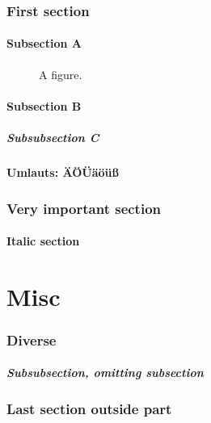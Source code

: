 \documentclass{article}
\begin{document}
  \section{First section}
    \subsection{Subsection A}
    \begin{figure}
      \hypertarget{fig}{}%
      A figure.
      \end{figure}
    \subsection{Subsection B}
    \subsubsection{Subsubsection C}
  \subsection{Umlauts: \"A\"O\"U\"a\"o\"u\ss}
  \newpage
  \section{Very important section}
  \subsection{Italic section}

  \part{Misc}
    \section{Diverse}
      \subsubsection{Subsubsection, omitting subsection}
      \section{Last section outside part}
\end{document}
